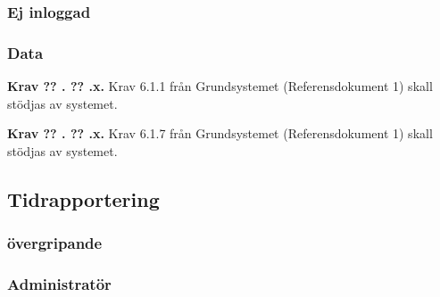 \documentclass[a4paper]{article}
\newcommand\getcurrentref[1]{%
 \ifnumequal{\value{#1}}{0}
  {??}
  {\the\value{#1}}%
}
\newcommand\requirement[2]{
	\numberedrow{Krav}{#1}{#2}
}
\newcommand\numberedrow[3]{
	\noindent
	\textbf{#1 \getcurrentref{section}.\getcurrentref{subsection}.#2.} #3
	
}
\begin{document}
		\subsubsection*{Ej inloggad}
		\subsubsection*{Data}
			\requirement{x}{Krav 6.1.1 från Grundsystemet (Referensdokument 1) skall stödjas av systemet.}
			\requirement{x}{Krav 6.1.7 från Grundsystemet (Referensdokument 1) skall stödjas av systemet.}

	\subsection{Tidrapportering}
		\label{krav-funk-tid}	
		\subsubsection*{övergripande}
		\subsubsection*{Administratör}
\end{document}
